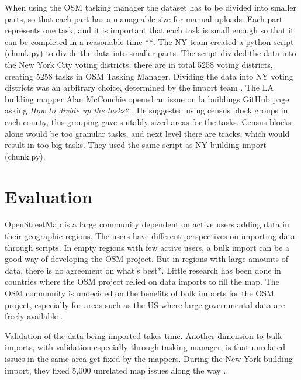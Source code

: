 When using the OSM tasking manager the dataset has to be divided into smaller parts, so that each part has a manageable size for manual uploads. Each part represents one task, and it is important that each task is small enough so that it can be completed in a reasonable time \cite{HOT} **. The NY team created a python script (chunk.py) to divide the data into smaller parts. The script divided the data into the New York City voting districts, there are in total 5258 voting districts, creating 5258 tasks in OSM Tasking Manager. Dividing the data into NY voting districts was an arbitrary choice, determined by the import team \cite{Barth2014}. The LA building mapper Alan McConchie opened an issue on la buildings GitHub page asking \textit{How to divide up the tasks?} \cite{McConchie2014}. He suggested using census block groups in each county, this grouping gave suitably sized areas for the tasks. Census blocks alone would be too granular tasks, and next level there are tracks, which would result in too big tasks. They used the same script as NY building import (chunk.py). 



\section{Evaluation}
OpenStreetMap is a large community dependent on active users adding data in their geographic regions. The users have different perspectives on importing data through scripts. In empty regions with few active users, a bulk import can be a good way of developing the OSM project. But in regions with large amounts of data, there is no agreement on what's best*. Little research has been done in countries where the OSM project relied on data imports to fill the map. The OSM community is undecided on the benefits of bulk imports for the OSM project, especially for areas such as the US where large governmental data are freely available \cite{Zielstra2013}.

Validation of the data being imported takes time. Another dimension to bulk imports, with validation especially through tasking manager, is that unrelated issues in the same area get fixed by the mappers. During the New York building import, they fixed 5,000 unrelated map issues along the way \cite{Barth2014}. 

